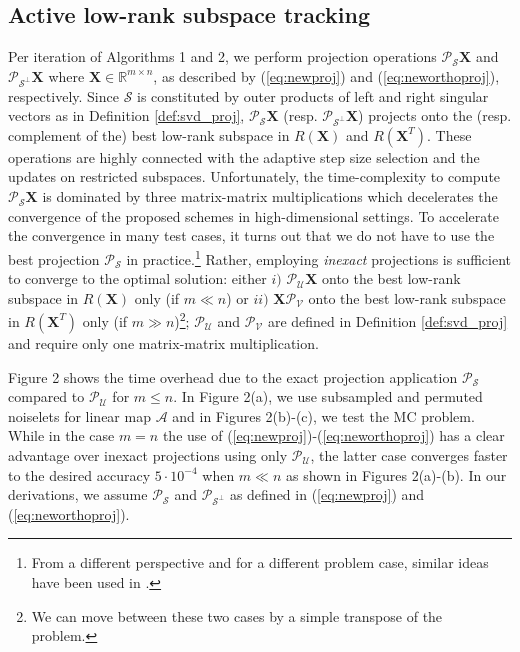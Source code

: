 \documentclass[twocolumn]{svjour3}
\newcommand{\sensing}{\boldsymbol{\mathcal{A}}}
\newcommand{\signal}{\boldsymbol{X}}
\newcommand{\dimension}{m \times n}
\begin{document}
\subsection{Active low-rank subspace tracking}
Per iteration of Algorithms 1 and 2, we perform projection operations $\mathcal{P}_{\mathcal{S}}\signal$ and $\mathcal{P}_{\mathcal{S}^{\bot}}\signal$ where $\signal \in \mathbb{R}^{\dimension}$, as described by (\ref{eq:newproj}) and (\ref{eq:neworthoproj}), respectively. Since $\mathcal{S} $ is constituted by outer products of left and right singular vectors as in Definition \ref{def:svd_proj}, $\mathcal{P}_{\mathcal{S}}\signal $ (resp. $\mathcal{P}_{\mathcal{S}^{\bot}}\signal$) projects onto the (resp. complement of the) best low-rank subspace in $R(\signal)$ and $R(\signal^T)$. These operations are highly connected with the adaptive step size selection and the updates on restricted subspaces. Unfortunately, the time-complexity to compute $\mathcal{P}_{\mathcal{S}}\signal$ is dominated by three matrix-matrix multiplications which decelerates the convergence of the proposed schemes in high-dimensional settings. To accelerate the convergence in many test cases, it turns out that we do not have to use the best projection $\mathcal{P}_{\mathcal{S}}$ in practice.\footnote{From a different perspective and for a different problem case, similar ideas have been used in \cite{ALM}.} Rather, employing {\it inexact} projections is sufficient to converge to the optimal solution: either $i)$ $\mathcal{P}_{\mathcal{U}}\signal$ onto the best low-rank subspace in $R(\signal)$ only (if $m \ll n$) or $ii)$ $\signal\mathcal{P}_{\mathcal{V}}$ onto the best low-rank subspace in $R(\signal^T)$ only (if $m \gg n$)\footnote{We can move between these two cases by a simple transpose of the problem.}; $\mathcal{P}_{\mathcal{U}}$ and $\mathcal{P}_{\mathcal{V}}$ are defined in Definition \ref{def:svd_proj} and require only one matrix-matrix multiplication. 

Figure 2 shows the time overhead due to the exact projection application $\mathcal{P}_{\mathcal{S}}$ compared to $\mathcal{P}_{\mathcal{U}}$ for $m \leq n$. In Figure 2(a), we use subsampled and permuted noiselets for linear map $\sensing$ and in Figures 2(b)-(c), we test the MC problem. While in the case $m = n$ the use of (\ref{eq:newproj})-(\ref{eq:neworthoproj}) has a clear advantage over inexact projections using only $\mathcal{P}_{\mathcal{U}}$, the latter case converges faster to the desired accuracy $5\cdot 10^{-4}$ when $m \ll n$ as shown in Figures 2(a)-(b).
In our derivations, we assume $\mathcal{P}_{\mathcal{S}}$ and $\mathcal{P}_{\mathcal{S}^{\bot}}$ as defined in  (\ref{eq:newproj}) and (\ref{eq:neworthoproj}). 
\end{document}
